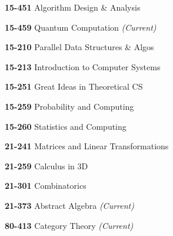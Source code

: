 \begin{cventries}
{\begin{cvitems}
\begin{multicols}{3}
          \item[] {\textbf{15-451} Algorithm Design \& Analysis}
          \item[] {\textbf{15-459} Quantum Computation \textit{\color{awesome}(Current)}}
          \item[] {\textbf{15-210} Parallel Data Structures \& Algos}
          \item[] {\textbf{15-213} Introduction to Computer Systems}
          \item[] {\textbf{15-251} Great Ideas in Theoretical CS}
          \item[] {\textbf{15-259} Probability and Computing}
          \item[] {\textbf{15-260} Statistics and Computing}
          \item[] {\textbf{21-241} Matrices and Linear Transformations}
          \item[] {\textbf{21-259} Calculus in 3D}
          \item[] {\textbf{21-301} Combinatorics}
          \item[] {\textbf{21-373} Abstract Algebra \textit{\color{awesome}(Current)}}
          \item[] {\textbf{80-413} Category Theory \textit{\color{awesome}(Current)}}
        \end{multicols}
      \end{cvitems}
    }
\end{cventries}
